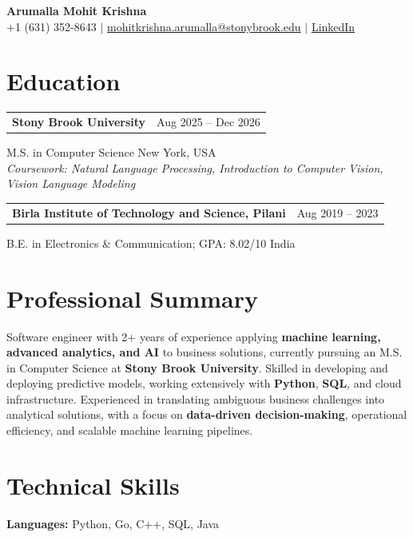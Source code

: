 \documentclass[letterpaper,10pt]{article}
\makeatletter
\newcommand{\entry}[2]{%
  \noindent
  \begin{tabularx}{\linewidth}
    {@{}>{\raggedright\arraybackslash}X@{\hspace{6pt}}r@{}}
    \textbf{#1} & #2
  \end{tabularx}\par
}
\makeatother
\begin{document}
\begin{center}
    {\LARGE\bfseries Arumalla Mohit Krishna}\\[3pt]
    +1 (631) 352-8643 $|$
    \href{mailto:mohitkrishna.arumalla@stonybrook.edu}
    {mohitkrishna.arumalla@stonybrook.edu} $|$
    \href{https://linkedin.com/in/mohit-krishna-arumalla}
    {LinkedIn}
\end{center}
\vspace{-8pt}

\section{Education}

\entry
  {\textbf{Stony Brook University}}
  {Aug 2025 -- Dec 2026}

M.S. in Computer Science \hfill New York, USA\\
\textit{
Coursework: Natural Language Processing,
Introduction to Computer Vision, Vision Language Modeling
}
\vspace{3pt}

\entry
  {\textbf{Birla Institute of Technology and Science, Pilani}}
  {Aug 2019 -- 2023}

B.E. in Electronics \& Communication; GPA: 8.02/10 \hfill India

\section{Professional Summary}

Software engineer with 2+ years of experience applying \textbf{machine learning, advanced analytics, and AI} to business solutions, currently pursuing an M.S. in Computer Science at \textbf{Stony Brook University}. Skilled in developing and deploying predictive models, working extensively with \textbf{Python}, \textbf{SQL}, and cloud infrastructure. Experienced in translating ambiguous business challenges into analytical solutions, with a focus on \textbf{data-driven decision-making}, operational efficiency, and scalable machine learning pipelines.

\section{Technical Skills}

\textbf{Languages:}
Python, Go, C++, SQL, Java\\
\end{document}
